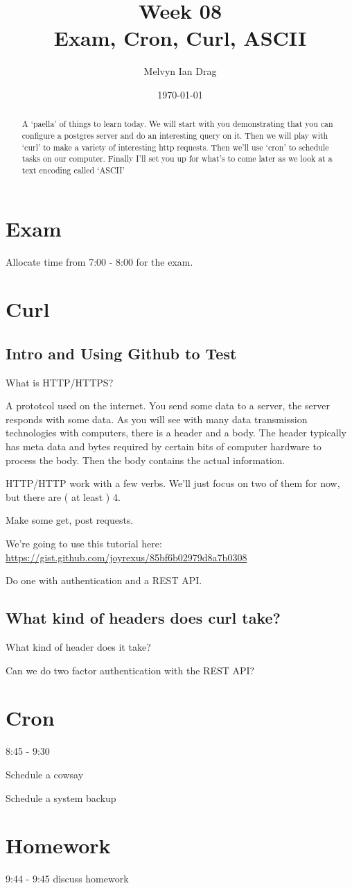 \documentclass[12pt]{article}
\title{\textbf{Week 08} \\
\Large Exam, Cron, Curl, ASCII}
\author{
	Melvyn Ian Drag
}
\date{\today}
\begin{document}
\maketitle

\begin{abstract}
A `paella' of things to learn today. We will start with you demonstrating that you can configure a postgres server and do an interesting query on it. Then we will play with `curl' to make a variety of interesting http requests. Then we'll use `cron' to schedule tasks on our computer. Finally I'll set you up for what's to come later as we look at a text encoding called `ASCII'
\end{abstract}


\section{Exam}
Allocate time from 7:00 - 8:00 for the exam.

\section{Curl}
\subsection{Intro and Using Github to Test}
What is HTTP/HTTPS?

A prototcol used on the internet. You send some data to a server, the server responds with some data. As you will see with many data transmission technologies with computers, there is a header and a body. The header typically has meta data and bytes required by certain bits of computer hardware to process the body. Then the body contains the actual information.

HTTP/HTTP work with a few verbs. We'll just focus on two of them for now, but there are ( at least ) 4. 

Make some get, post requests. 

We're going to use this tutorial here:
\url{https://gist.github.com/joyrexus/85bf6b02979d8a7b0308}

Do one with authentication and a REST API.

\subsection{What kind of headers does curl take?}
What kind of header does it take?

Can we do two factor authentication with the REST API?

\subsection{}

\section{Cron}
8:45 - 9:30

Schedule a cowsay

Schedule a system backup

\section{Homework}
9:44 - 9:45 discuss homework
\end{document}
